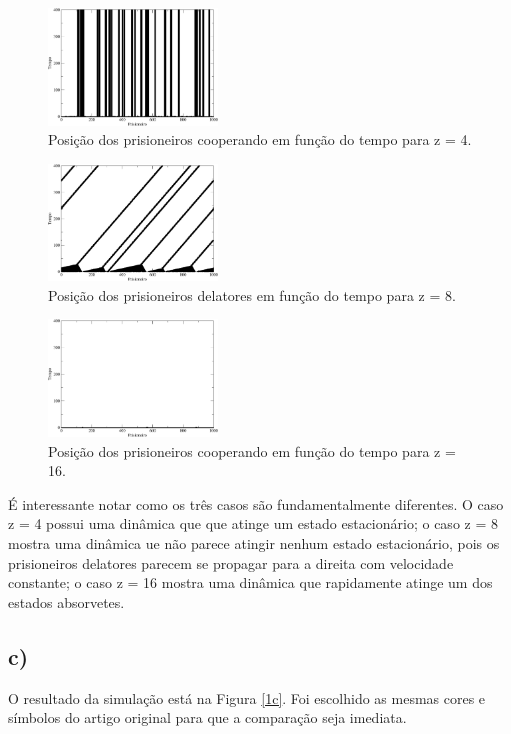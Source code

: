 \documentclass[a4wide]{report}
\begin{document}
\begin{figure}[!htb]
\centering
\includegraphics[width=0.4\textwidth]{z4.pdf}
\caption{Posição dos prisioneiros cooperando em função do tempo para z = 4.}
\label{1b}
\end{figure}

\begin{figure}[!htb]
\centering
\includegraphics[width=0.4\textwidth]{z8_2.pdf}
\caption{Posição dos prisioneiros delatores em função do tempo para z = 8.}
\label{2b}
\end{figure}

\begin{figure}[!htb]
\centering
\includegraphics[width=0.4\textwidth]{z16.pdf}
\caption{Posição dos prisioneiros cooperando em função do tempo para z = 16.}
\label{3b}
\end{figure}

É interessante notar como os três casos são fundamentalmente diferentes. O caso z = 4 possui uma dinâmica que que atinge um estado estacionário; o caso z = 8 mostra uma dinâmica ue não parece atingir nenhum estado estacionário, pois os prisioneiros delatores parecem se propagar para a direita com velocidade constante; o caso z = 16 mostra uma dinâmica que rapidamente atinge um dos estados absorvetes.

\subsection*{c) }
O resultado da simulação está na Figura \ref{1c}. Foi escolhido as mesmas cores e símbolos do artigo original para que a comparação seja imediata.
\end{document}

